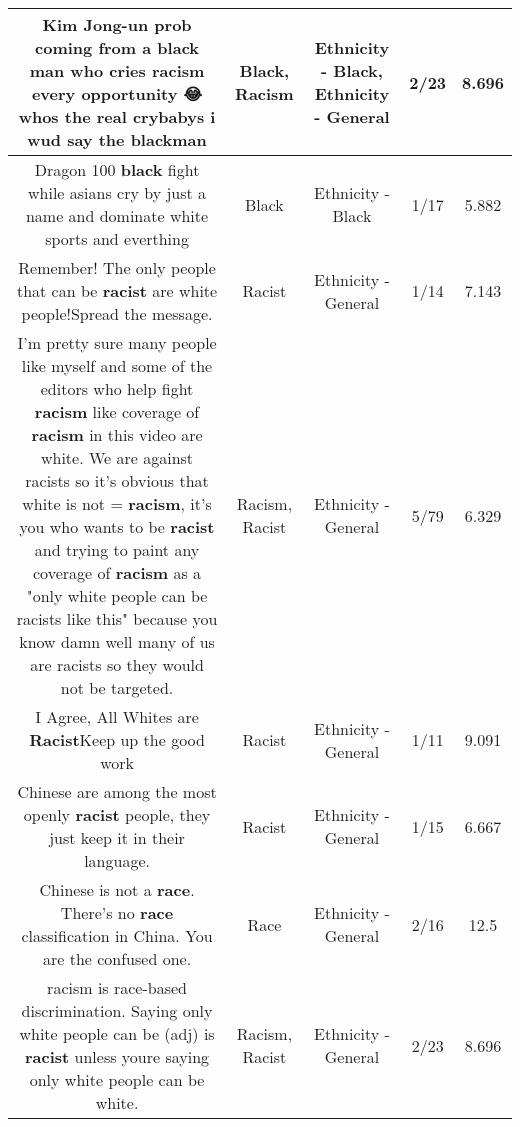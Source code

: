 \documentclass[11pt]{article}
\newlength\mylength
\begin{document}
\begin{center}
\begin{longtable}{|C{.65\mylength}|C{.30\mylength}|C{.12\mylength}|C{.12\mylength}|C{.12\mylength}|}
  \small Kim Jong-un prob coming from a \textbf{black} man who cries \textbf{racism} every opportunity 😂 whos the real crybabys i wud say the blackman\normalsize   & Black, Racism & Ethnicity - Black, Ethnicity - General & 2/23 & 8.696 \\  \hline
  \small Dragon 100 \textbf{black} fight while asians cry by just a name and dominate white sports and everthing\normalsize   & Black & Ethnicity - Black & 1/17 & 5.882 \\  \hline
  \small Remember! The only people that can be \textbf{racist} are white people!Spread the message.\normalsize   & Racist & Ethnicity - General & 1/14 & 7.143 \\  \hline
  \small I'm pretty sure many people like myself and some of the editors who help fight \textbf{racism} like coverage of \textbf{racism} in this video are white. We are against racists so it's obvious that white is not = \textbf{racism}, it's you who wants to be \textbf{racist} and trying to paint any coverage of \textbf{racism} as a "only white people can be racists like this" because you know damn well many of us are racists so they would not be targeted.\normalsize   & Racism, Racist & Ethnicity - General & 5/79 & 6.329 \\  \hline
  \small I Agree, All Whites are \textbf{Racist}Keep up the good work\normalsize   & Racist & Ethnicity - General & 1/11 & 9.091 \\  \hline
  \small Chinese are among the most openly \textbf{racist} people, they just keep it in their language.\normalsize   & Racist & Ethnicity - General & 1/15 & 6.667 \\  \hline
  \small Chinese is not a \textbf{race}. There's no \textbf{race} classification in China. You are the confused one.\normalsize   & Race & Ethnicity - General & 2/16 & 12.5 \\  \hline
  \small racism is race-based discrimination. Saying only white people can be    (adj) is \textbf{racist} unless youre saying only white people can be white.\normalsize   & Racism, Racist & Ethnicity - General & 2/23 & 8.696 \\  \hline

\end{longtable}
\end{center}
\end{document}
